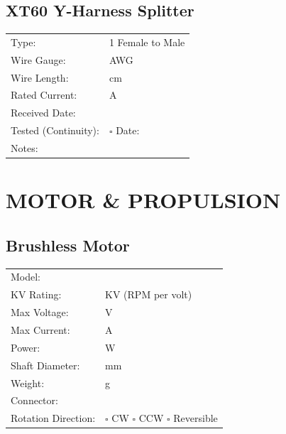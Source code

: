 \documentclass[10pt,letterpaper]{article}
\begin{document}
\subsection*{XT60 Y-Harness Splitter}
\begin{tabularx}{\textwidth}{lX}
Type: & 1 Female to \underline{\hspace{2cm}} Male \\
Wire Gauge: & \underline{\hspace{4cm}} AWG \\
Wire Length: & \underline{\hspace{4cm}} cm \\
Rated Current: & \underline{\hspace{4cm}} A \\[0.5em]
Received Date: & \underline{\hspace{4cm}} \\
Tested (Continuity): & $\square$ \quad Date: \underline{\hspace{3cm}} \\
Notes: & \underline{\hspace{10cm}} \\
\end{tabularx}

\newpage

\section*{MOTOR \& PROPULSION}

\subsection*{Brushless Motor}
\begin{tabularx}{\textwidth}{lX}
Model: & \underline{\hspace{8cm}} \\
KV Rating: & \underline{\hspace{4cm}} KV (RPM per volt) \\
Max Voltage: & \underline{\hspace{4cm}} V \\
Max Current: & \underline{\hspace{4cm}} A \\
Power: & \underline{\hspace{4cm}} W \\
Shaft Diameter: & \underline{\hspace{4cm}} mm \\
Weight: & \underline{\hspace{4cm}} g \\
Connector: & \underline{\hspace{6cm}} \\
Rotation Direction: & $\square$ CW \quad $\square$ CCW \quad $\square$ Reversible \\
\end{tabularx}
\end{document}
